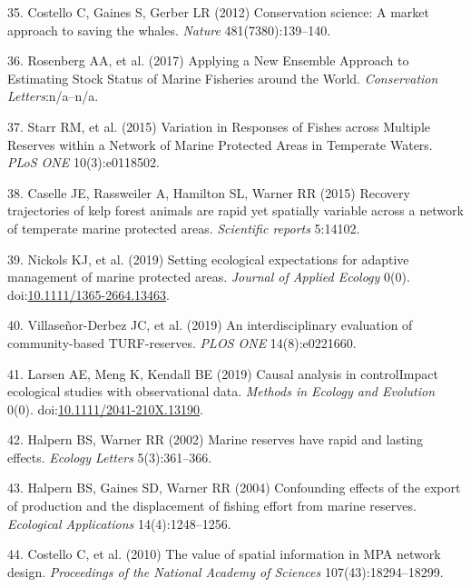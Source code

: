 \documentclass[9pt,twocolumn,twoside,lineno]{pnas-new}
\begin{document}
\leavevmode\hypertarget{ref-costello2012}{}%
35. Costello C, Gaines S, Gerber LR (2012) Conservation science: A
market approach to saving the whales. \emph{Nature} 481(7380):139--140.

\leavevmode\hypertarget{ref-rosenberg2017}{}%
36. Rosenberg AA, et al. (2017) Applying a New Ensemble Approach to
Estimating Stock Status of Marine Fisheries around the World.
\emph{Conservation Letters}:n/a--n/a.

\leavevmode\hypertarget{ref-starr2015}{}%
37. Starr RM, et al. (2015) Variation in Responses of Fishes across
Multiple Reserves within a Network of Marine Protected Areas in
Temperate Waters. \emph{PLoS ONE} 10(3):e0118502.

\leavevmode\hypertarget{ref-caselle2015}{}%
38. Caselle JE, Rassweiler A, Hamilton SL, Warner RR (2015) Recovery
trajectories of kelp forest animals are rapid yet spatially variable
across a network of temperate marine protected areas. \emph{Scientific
reports} 5:14102.

\leavevmode\hypertarget{ref-nickols2019}{}%
39. Nickols KJ, et al. (2019) Setting ecological expectations for
adaptive management of marine protected areas. \emph{Journal of Applied
Ecology} 0(0).
doi:\href{https://doi.org/10.1111/1365-2664.13463}{10.1111/1365-2664.13463}.

\leavevmode\hypertarget{ref-villasenor-derbez2019}{}%
40. Villaseñor-Derbez JC, et al. (2019) An interdisciplinary evaluation
of community-based TURF-reserves. \emph{PLOS ONE} 14(8):e0221660.

\leavevmode\hypertarget{ref-larsen2019}{}%
41. Larsen AE, Meng K, Kendall BE (2019) Causal analysis in
controlImpact ecological studies with observational data. \emph{Methods
in Ecology and Evolution} 0(0).
doi:\href{https://doi.org/10.1111/2041-210X.13190}{10.1111/2041-210X.13190}.

\leavevmode\hypertarget{ref-halpern2002}{}%
42. Halpern BS, Warner RR (2002) Marine reserves have rapid and lasting
effects. \emph{Ecology Letters} 5(3):361--366.

\leavevmode\hypertarget{ref-halpern2004}{}%
43. Halpern BS, Gaines SD, Warner RR (2004) Confounding effects of the
export of production and the displacement of fishing effort from marine
reserves. \emph{Ecological Applications} 14(4):1248--1256.

\leavevmode\hypertarget{ref-costello2010d}{}%
44. Costello C, et al. (2010) The value of spatial information in MPA
network design. \emph{Proceedings of the National Academy of Sciences}
107(43):18294--18299.
\end{document}
